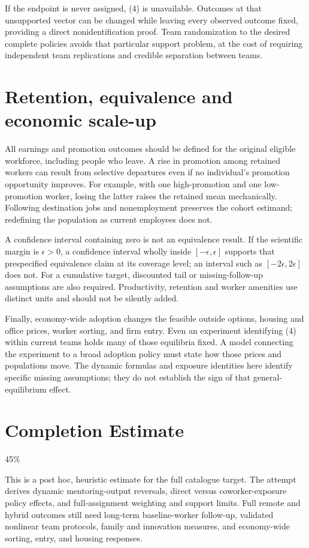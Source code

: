 \documentclass[11pt,a4paper]{article}
\begin{document}
If the endpoint is never assigned, (4) is unavailable. Outcomes at that unsupported vector can be changed while leaving every observed outcome fixed, providing a direct nonidentification proof. Team randomization to the desired complete policies avoids that particular support problem, at the cost of requiring independent team replications and credible separation between teams.

\section{Retention, equivalence and economic scale-up}
All earnings and promotion outcomes should be defined for the original eligible workforce, including people who leave. A rise in promotion among retained workers can result from selective departures even if no individual's promotion opportunity improves. For example, with one high-promotion and one low-promotion worker, losing the latter raises the retained mean mechanically. Following destination jobs and nonemployment preserves the cohort estimand; redefining the population as current employees does not.

A confidence interval containing zero is not an equivalence result. If the scientific margin is $\epsilon>0$, a confidence interval wholly inside $[-\epsilon,\epsilon]$ supports that prespecified equivalence claim at its coverage level; an interval such as $[-2\epsilon,2\epsilon]$ does not. For a cumulative target, discounted tail or missing-follow-up assumptions are also required. Productivity, retention and worker amenities use distinct units and should not be silently added.

Finally, economy-wide adoption changes the feasible outside options, housing and office prices, worker sorting, and firm entry. Even an experiment identifying (4) within current teams holds many of those equilibria fixed. A model connecting the experiment to a broad adoption policy must state how those prices and populations move. The dynamic formulas and exposure identities here identify specific missing assumptions; they do not establish the sign of that general-equilibrium effect.

\section{Completion Estimate}
45\%

This is a post hoc, heuristic estimate for the full catalogue target.
The attempt derives dynamic mentoring-output reversals, direct versus coworker-exposure policy effects, and full-assignment weighting and support limits. Full remote and hybrid outcomes still need long-term baseline-worker follow-up, validated nonlinear team protocols, family and innovation measures, and economy-wide sorting, entry, and housing responses.
\end{document}
